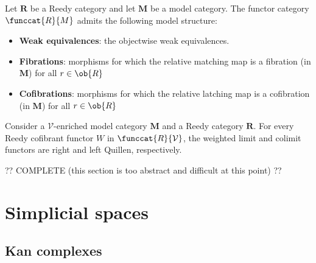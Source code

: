     \begin{property}
        Let $\mathbf{R}$ be a Reedy category and let $\mathbf{M}$ be a model category. The functor category $\funccat{R}{M}$ admits the following model structure:
        \begin{itemize}
            \item\textbf{Weak equivalences}: the objectwise weak equivalences.
            \item\textbf{Fibrations}: morphisms for which the relative matching map is a fibration (in $\mathbf{M}$) for all $r\in\ob{R}$
            \item\textbf{Cofibrations}: morphisms for which the relative latching map is a cofibration (in $\mathbf{M}$) for all $r\in\ob{R}$
        \end{itemize}
    \end{property}

    \begin{property}
        Consider a $\mathcal{V}$-enriched model category $\mathbf{M}$ and a Reedy category $\mathbf{R}$. For every Reedy cofibrant functor $W$ in $\funccat{R}{\mathcal{V}}$, the weighted limit and colimit functors are right and left Quillen, respectively.
    \end{property}

    ?? COMPLETE (this section is too abstract and difficult at this point) ??

\section{Simplicial spaces}
\subsection{Kan complexes}



